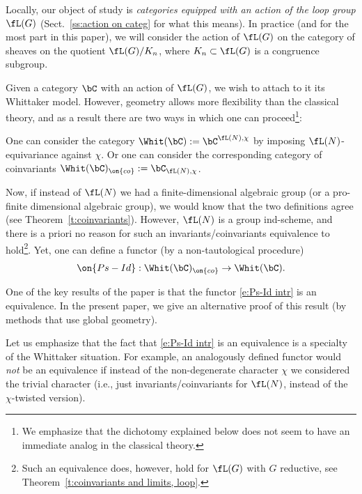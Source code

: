\documentclass[9pt]{amsart}
\theoremstyle{definition}
\theoremstyle{remark}
\newcommand{\thmref}[1]{Theorem~\ref{#1}}
\newcommand{\secref}[1]{Sect.~\ref{#1}}
\numberwithin{equation}{section}
\begin{document}
Locally, our object of study is \emph{categories equipped with an action of the loop group $\fL(G)$} (\secref{ss:action on categ}
for what this means). In practice (and for the most part in this paper), we will consider the action of $\fL(G)$ on the category
of sheaves on the quotient $\fL(G)/K_n$, where $K_n\subset \fL(G)$ is a congruence subgroup. 

\medskip

Given a category $\bC$ with an action of $\fL(G)$, we wish to attach to it its Whittaker model. However, geometry allows more flexibility 
than the classical theory, and as a result there are two ways in which one can proceed\footnote{We emphasize that the dichotomy explained
below does not seem to have an immediate analog in the classical theory.}: 

\medskip

One can consider the category $\Whit(\bC):=\bC^{\fL(N),\chi}$ by imposing $\fL(N)$-equivariance against $\chi$. Or one
can consider the corresponding category of coinvariants $\Whit(\bC)_{\on{co}}:=\bC_{\fL(N),\chi}$.

\medskip

Now, if instead of $\fL(N)$ we had a finite-dimensional algebraic group (or a pro-finite dimensional algebraic group),
we would know that the two definitions agree (see \thmref{t:coinvariants}). However, $\fL(N)$ is a group ind-scheme,
and there is a priori no reason for such an invariants/coinvariants equivalence to hold\footnote{Such an equivalence does,
however, hold for $\fL(G)$ with $G$ reductive, see \thmref{t:coinvariants and limits, loop}.}. Yet, one can define a functor
(by a non-tautological procedure)
\begin{equation} \label{e:Ps-Id intr}
\on{Ps-Id}:\Whit(\bC)_{\on{co}}\to \Whit(\bC).
\end{equation} 

One of the key results of the paper \cite{Ras} is that the functor \eqref{e:Ps-Id intr} is an equivalence. In the present 
paper, we give an alternative proof of this result (by methods that use global geometry). 

\medskip

Let us emphasize that the fact that \eqref{e:Ps-Id intr} is an equivalence is a specialty of the Whittaker situation. For example, 
an analogously defined functor would \emph{not} be an equivalence if instead of the non-degenerate character
$\chi$ we considered the trivial character (i.e., just invariants/coinvariants for $\fL(N)$, instead of the $\chi$-twisted
version). 
\end{document}
